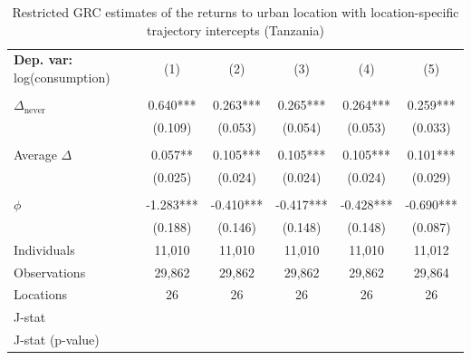 \begin{table}[htbp] \centering \begin{threeparttable}
 \caption{Restricted GRC estimates of the returns to urban location with location-specific trajectory intercepts (Tanzania)} 
 \label{tab:verdier_robust_onestep_TZA_consumption_urban_unb} 
\begin{tabular}{l ccccc} \toprule  \textbf{Dep. var:}  log(consumption) 
                    &\multicolumn{1}{c}{(1)}   &\multicolumn{1}{c}{(2)}   &\multicolumn{1}{c}{(3)}   &\multicolumn{1}{c}{(4)}   &\multicolumn{1}{c}{(5)}   \\
                    &               &               &               &               &               \\
\addlinespace
$\Delta_{\text{never}}$&       0.640***&       0.263***&       0.265***&       0.264***&       0.259***\\
                    &     (0.109)   &     (0.053)   &     (0.054)   &     (0.053)   &     (0.033)   \\
                    &               &               &               &               &               \\
\addlinespace
Average $\Delta$    &       0.057** &       0.105***&       0.105***&       0.105***&       0.101***\\
                    &     (0.025)   &     (0.024)   &     (0.024)   &     (0.024)   &     (0.029)   \\
                    &               &               &               &               &               \\
\addlinespace
$\phi$              &      -1.283***&      -0.410***&      -0.417***&      -0.428***&      -0.690***\\
                    &     (0.188)   &     (0.146)   &     (0.148)   &     (0.148)   &     (0.087)   \\
\addlinespace
Individuals         &      11,010   &      11,010   &      11,010   &      11,010   &      11,012   \\
Observations        &      29,862   &      29,862   &      29,862   &      29,862   &      29,864   \\
Locations           &          26   &          26   &          26   &          26   &          26   \\
J-stat              &               &               &               &               &               \\
J-stat (p-value)    &               &               &               &               &               \\

\end{tabular}
\end{threeparttable}
\end{table}
